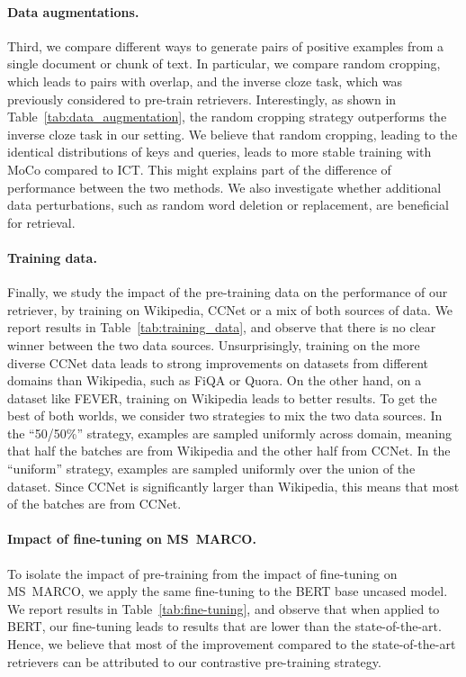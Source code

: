 \documentclass[10pt]{article} %
\begin{document}
\paragraph{Data augmentations.}
Third, we compare different ways to generate pairs of positive examples from a single document or chunk of text.
In particular, we compare random cropping, which leads to pairs with overlap, and the inverse cloze task, which was previously considered to pre-train retrievers.
Interestingly, as shown in Table~\ref{tab:data_augmentation}, the random cropping strategy outperforms the inverse cloze task in our setting.
We believe that random cropping, leading to the identical distributions of keys and queries, leads to more stable training with MoCo compared to ICT.
This might explains part of the difference of performance between the two methods.
We also investigate whether additional data perturbations, such as random word deletion or replacement, are beneficial for retrieval.

\paragraph{Training data.}
Finally, we study the impact of the pre-training data on the performance of our retriever, by training on Wikipedia, CCNet or a mix of both sources of data.
We report results in Table~\ref{tab:training_data}, and observe that there is no clear winner between the two data sources.
Unsurprisingly, training on the more diverse CCNet data leads to strong improvements on datasets from different domains than Wikipedia, such as FiQA or Quora.
On the other hand, on a dataset like FEVER, training on Wikipedia leads to better results.
To get the best of both worlds, we consider two strategies to mix the two data sources.
In the ``50/50\%'' strategy, examples are sampled uniformly across domain, meaning that half the batches are from Wikipedia and the other half from CCNet.
In the ``uniform'' strategy, examples are sampled uniformly over the union of the dataset.
Since CCNet is significantly larger than Wikipedia, this means that most of the batches are from CCNet.

\paragraph{Impact of fine-tuning on MS~MARCO.}
To isolate the impact of pre-training from the impact of fine-tuning on MS~MARCO, we apply the same fine-tuning to the BERT base uncased model.
We report results in Table~\ref{tab:fine-tuning}, and observe that when applied to BERT, our fine-tuning leads to results that are lower than the state-of-the-art.
Hence, we believe that most of the improvement compared to the state-of-the-art retrievers can be attributed to our contrastive pre-training strategy.
\end{document}
